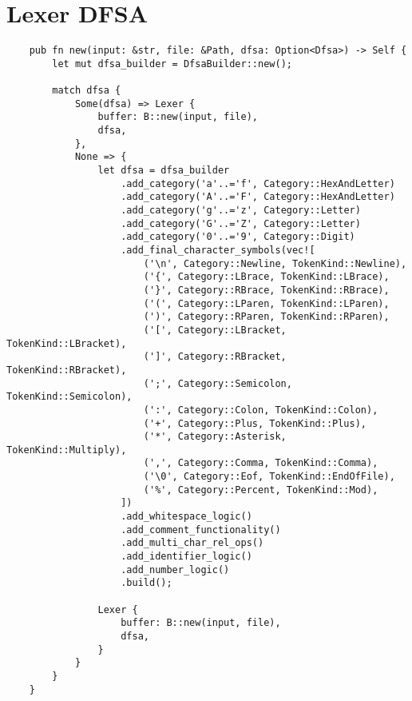 

\appendix

\section{Lexer DFSA}
\label{sec:lexer-dfsa}

\begin{mainbox}{}
    \lstset{xleftmargin=0cm}
    \begin{lstlisting}
    pub fn new(input: &str, file: &Path, dfsa: Option<Dfsa>) -> Self {
        let mut dfsa_builder = DfsaBuilder::new();

        match dfsa {
            Some(dfsa) => Lexer {
                buffer: B::new(input, file),
                dfsa,
            },
            None => {
                let dfsa = dfsa_builder
                    .add_category('a'..='f', Category::HexAndLetter)
                    .add_category('A'..='F', Category::HexAndLetter)
                    .add_category('g'..='z', Category::Letter)
                    .add_category('G'..='Z', Category::Letter)
                    .add_category('0'..='9', Category::Digit)
                    .add_final_character_symbols(vec![
                        ('\n', Category::Newline, TokenKind::Newline),
                        ('{', Category::LBrace, TokenKind::LBrace),
                        ('}', Category::RBrace, TokenKind::RBrace),
                        ('(', Category::LParen, TokenKind::LParen),
                        (')', Category::RParen, TokenKind::RParen),
                        ('[', Category::LBracket, TokenKind::LBracket),
                        (']', Category::RBracket, TokenKind::RBracket),
                        (';', Category::Semicolon, TokenKind::Semicolon),
                        (':', Category::Colon, TokenKind::Colon),
                        ('+', Category::Plus, TokenKind::Plus),
                        ('*', Category::Asterisk, TokenKind::Multiply),
                        (',', Category::Comma, TokenKind::Comma),
                        ('\0', Category::Eof, TokenKind::EndOfFile),
                        ('%', Category::Percent, TokenKind::Mod),
                    ])
                    .add_whitespace_logic()
                    .add_comment_functionality()
                    .add_multi_char_rel_ops()
                    .add_identifier_logic()
                    .add_number_logic()
                    .build();

                Lexer {
                    buffer: B::new(input, file),
                    dfsa,
                }
            }
        }
    }
    \end{lstlisting}
\end{mainbox}